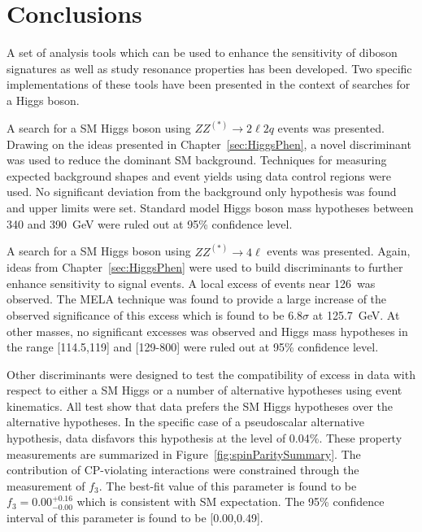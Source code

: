 \chapter{Conclusions}
\label{sec:Conclusions}

A set of analysis tools which can be used to enhance the
sensitivity of diboson signatures as well as study resonance
properties has been developed.  Two specific implementations 
of these tools have been presented in the context of searches
for a Higgs boson. 

A search for a SM Higgs boson using $ZZ^{(*)}\to2\ell2q$ events
was presented.  
Drawing on the ideas presented in Chapter~\ref{sec:HiggsPhen},
a novel discriminant was used to reduce the dominant SM
background. 
Techniques for measuring expected background
shapes and event yields using data control regions were used.
No significant deviation from the background 
only hypothesis was found and upper limits were set.
Standard model Higgs boson mass hypotheses between 340 and 390~GeV
were ruled out at 95\% confidence level.

A search for a SM Higgs boson using $ZZ^{(*)}\to4\ell$ events
was presented.  Again, ideas from Chapter~\ref{sec:HiggsPhen} 
were used to build discriminants to further enhance sensitivity
to signal events.  A local excess of events near 126~\GeV was
observed.  The MELA technique was found to provide a
large increase of the observed significance of this 
excess which is found to be $6.8\sigma$ at 125.7~GeV.
At other masses, no significant excesses was observed 
and Higgs mass hypotheses in the range [114.5,119] and [129-800]
were ruled out at 95\% confidence level. 

Other discriminants were designed to test the
compatibility of excess in data with respect to either
a SM Higgs or
a number of alternative hypotheses using event kinematics.  All 
test show that data prefers the SM Higgs hypotheses over
the alternative hypotheses.  In the specific case of a
pseudoscalar alternative hypothesis, data disfavors this
hypothesis at the level of 0.04\%.  These property
measurements are summarized in Figure~\ref{fig:spinParitySummary}.
The contribution of CP-violating 
interactions were constrained through the measurement of $f_{3}$.
The best-fit
value of this parameter is found to be $f_{3}=0.00^{+0.16}_{-0.00}$
which is consistent with SM expectation.  The 95\% confidence 
interval of this parameter is found to be [0.00,0.49].


